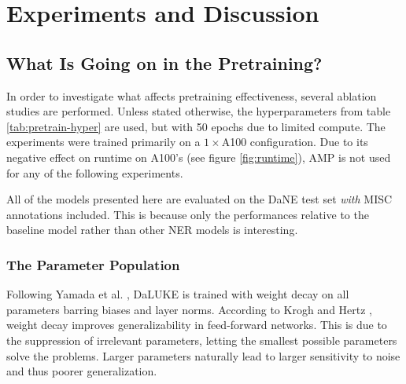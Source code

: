 \documentclass[main.tex]{subfiles}
\begin{document}
\chapter{Experiments and Discussion}

\section{What Is Going on in the Pretraining?}
\label{sec:pretrainpls}
In order to investigate what affects pretraining effectiveness, several ablation studies are performed.
Unless stated otherwise, the hyperparameters from table \ref{tab:pretrain-hyper} are used, but with 50 epochs due to limited compute.
The experiments were trained primarily on a $ 1\times$A100 configuration.
Due to its negative effect on runtime on A100's (see figure \ref{fig:runtime}), AMP is not used for any of the following experiments.

All of the models presented here are evaluated on the DaNE test set \emph{with} MISC annotations included.
This is because only the performances relative to the baseline model rather than other NER models is interesting.

\subsection{The Parameter Population}
Following Yamada et al. \cite{yamada2020luke}, DaLUKE is trained with weight decay on all parameters barring biases and layer norms.
According to Krogh and Hertz \cite{krogh1991weight}, weight decay improves generalizability in feed-forward networks.
This is due to the suppression of irrelevant parameters, letting the smallest possible parameters solve the problems.
Larger parameters naturally lead to larger sensitivity to noise and thus poorer generalization.
\end{document}
